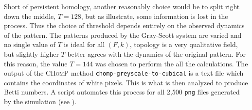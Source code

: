 Short of persistent homology, another reasonably choice would be to split right down the middle, $T = 128$, but as  illustrate, some information is lost in the process. Thus the choice of threshold depends entirely on the observed dynamics of the pattern. The patterns produced by the Gray-Scott system are varied and no single value of $T$ is ideal for all $(F, k)$, topology is a very qualitative field, but slightly higher $T$ better agrees with the dynamics of the original pattern. For this reason, the value $T = 144$ was chosen to perform the all the calculations. The output of the \textsc{CHomP} method \texttt{chomp-greyscale-to-cubical} is a text file which contains the coordinates of white pixels. This is what is then analyzed to produce Betti numbers. A script automates this process for all 2,500 \texttt{png} files generated by the simulation (see ).

